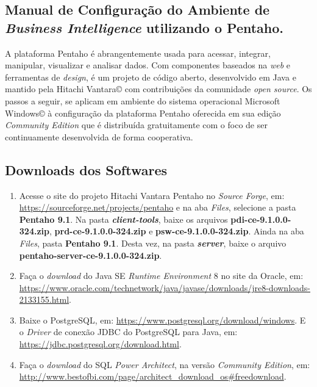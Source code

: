 \begin{apendicesenv}

\partapendices

\chapter{Manual de Configuração do Ambiente de \textit{Business Intelligence} utilizando o Pentaho.}


A plataforma Pentaho é abrangentemente usada para acessar, integrar, manipular, visualizar e analisar dados. Com componentes baseados na \textit{web} e ferramentas de \textit{design}, é um projeto de código aberto, desenvolvido em Java e mantido pela Hitachi Vantara© com contribuições da comunidade \textit{open source}. Os passos a seguir, se aplicam em ambiente do sistema operacional Microsoft Windows© à configuração da plataforma Pentaho oferecida em sua edição \textit{Community Edition} que é distribuída gratuitamente com o foco de ser continuamente desenvolvida de forma cooperativa. 

\section{Downloads dos Softwares}

\begin{enumerate}
   \item Acesse o site do projeto Hitachi Vantara Pentaho no \textit{Source Forge}, em: \url{https://sourceforge.net/projects/pentaho} e na aba \textit{Files}, selecione a pasta \textbf{Pentaho 9.1}. Na pasta \textbf{\textit{client-tools}}, baixe os arquivos \textbf{pdi-ce-9.1.0.0-324.zip}, \textbf{prd-ce-9.1.0.0-324.zip} e \textbf{psw-ce-9.1.0.0-324.zip}. Ainda na aba \textit{Files}, pasta \textbf{Pentaho 9.1}. Desta vez, na pasta \textbf{\textit{server}}, baixe o arquivo \textbf{pentaho-server-ce-9.1.0.0-324.zip}.
   \item Faça o \textit{download} do Java SE \textit{Runtime Environment} 8 no site da Oracle, em: \url{https://www.oracle.com/technetwork/java/javase/downloads/jre8-downloads-2133155.html}.
   \item Baixe o PostgreSQL, em: \url{https://www.postgresql.org/download/windows}. E o \textit{Driver} de conexão JDBC do PostgreSQL para Java, em: \url{https://jdbc.postgresql.org/download.html}.
   \item Faça o \textit{download} do SQL \textit{Power Architect}, na versão \textit{Community Edition}, em: \url{http://www.bestofbi.com/page/architect_download_os#freedownload}.
\end{enumerate}


\end{apendicesenv}
